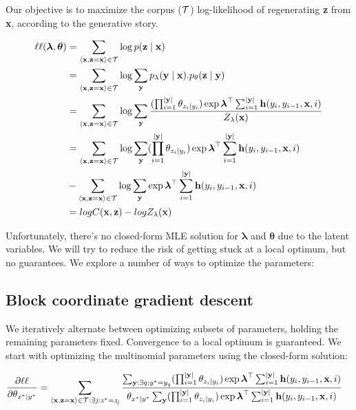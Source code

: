 \documentclass[11pt,onecolumn]{article}
\begin{document}
Our objective is to maximize the corpus ($\cal{T}$) log-likelihood of regenerating \textbf{z} from \textbf{x}, according to the generative story.

\begin{align}
\ell\ell(\boldsymbol{\lambda}, \boldsymbol{\theta}) &= \sum_{\langle\mathbf{x},\mathbf{z}=\mathbf{x}\rangle \in \cal{T}} \log p(\mathbf{z}\mid\mathbf{x}) \\
 &= \sum_{\langle\mathbf{x},\mathbf{z}=\mathbf{x}\rangle \in \cal{T}} \log \sum_{\mathbf{y}} p_\lambda(\mathbf{y}\mid\mathbf{x}).p_\theta(\mathbf{z}\mid\mathbf{y}) \\
 &= \sum_{\langle\mathbf{x},\mathbf{z}=\mathbf{x}\rangle \in \cal{T}} \log \sum_{\mathbf{y}} \frac{(\prod_{i=1}^{|\mathbf{y}|} \theta_{z_i\mid y_i}) \exp \boldsymbol{\lambda}^\top \sum_{i=1}^{|\mathbf{y}|} \mathbf{h}(y_i, y_{i-1}, \mathbf{x}, i)}{Z_\lambda(\mathbf{x})} \\
&= \sum_{\langle\mathbf{x},\mathbf{z}=\mathbf{x}\rangle \in \cal{T}} \log \sum_{\mathbf{y}} (\prod_{i=1}^{|\mathbf{y}|} \theta_{z_i\mid y_i}) \exp \boldsymbol{\lambda}^\top \sum_{i=1}^{|\mathbf{y}|} \mathbf{h}(y_i, y_{i-1}, \mathbf{x}, i) \nonumber \\
 &- \sum_{\langle\mathbf{x},\mathbf{z}=\mathbf{x}\rangle \in \cal{T}} \log \sum_{\mathbf{y}} \exp \boldsymbol{\lambda}^\top \sum_{i=1}^{|\mathbf{y}|} \mathbf{h}(y_i, y_{i-1}, \mathbf{x}, i) \\
 &= log C(\mathbf{x}, \mathbf{z}) - log Z_\lambda(\mathbf{x})
\end{align}

Unfortunately, there's no closed-form MLE solution for $\boldsymbol{\lambda}$ and $\boldsymbol{\theta}$ due to the latent variables. We will try to reduce the risk of getting stuck at a local optimum, but no guarantees. We explore a number of ways to optimize the parameters:

\subsection{Block coordinate gradient descent}

We iteratively alternate between optimizing subsets of parameters, holding the remaining parameters fixed. Convergence to a local optimum is guaranteed. We start with optimizing the multinomial parameters using the closed-form solution:

\begin{align}
\frac{\partial \ell\ell}{\partial \theta_{x^*|y^*}} &= \sum_{\langle\mathbf{x},\mathbf{z}=\mathbf{x}\rangle \in \cal{T} : \exists \mathit{j} : \mathit{z}^* = \mathit{z}_\mathit{j} } \frac{\sum_{\mathbf{y}:\exists q:y^*=y_q} (\prod_{i=1}^{|\mathbf{y}|} \theta_{z_i\mid y_i}) \exp \boldsymbol{\lambda}^\top \sum_{i=1}^{|\mathbf{y}|} \mathbf{h}(y_i, y_{i-1}, \mathbf{x}, i) }{\theta_{x^*|y^*} \sum_{\mathbf{y}} (\prod_{i=1}^{|\mathbf{y}|} \theta_{z_i\mid y_i}) \exp \boldsymbol{\lambda}^\top \sum_{i=1}^{|\mathbf{y}|} \mathbf{h}(y_i, y_{i-1}, \mathbf{x}, i)}
\end{align}
\end{document}
